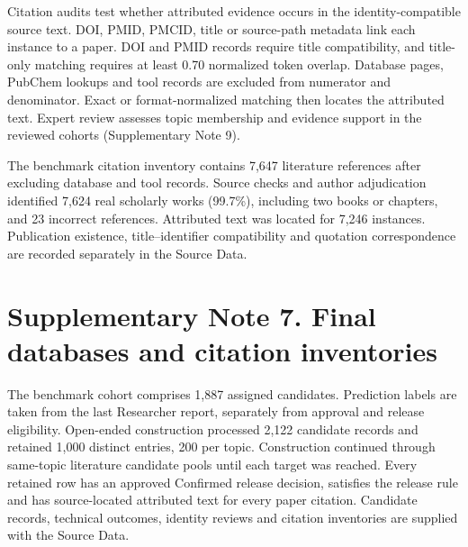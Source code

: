\documentclass[10pt]{article}
\begin{document}
Citation audits test whether attributed evidence occurs in the identity-compatible source text. DOI, PMID, PMCID, title or source-path metadata link each instance to a paper. DOI and PMID records require title compatibility, and title-only matching requires at least 0.70 normalized token overlap. Database pages, PubChem lookups and tool records are excluded from numerator and denominator. Exact or format-normalized matching then locates the attributed text. Expert review assesses topic membership and evidence support in the reviewed cohorts (Supplementary Note 9).

The benchmark citation inventory contains 7,647 literature references after excluding database and tool records. Source checks and author adjudication identified 7,624 real scholarly works (99.7\%), including two books or chapters, and 23 incorrect references. Attributed text was located for 7,246 instances. Publication existence, title--identifier compatibility and quotation correspondence are recorded separately in the Source Data.

\section*{Supplementary Note 7. Final databases and citation inventories}

The benchmark cohort comprises 1,887 assigned candidates. Prediction labels are taken from the last Researcher report, separately from approval and release eligibility. Open-ended construction processed 2,122 candidate records and retained 1,000 distinct entries, 200 per topic. Construction continued through same-topic literature candidate pools until each target was reached. Every retained row has an approved Confirmed release decision, satisfies the release rule and has source-located attributed text for every paper citation. Candidate records, technical outcomes, identity reviews and citation inventories are supplied with the Source Data.
\end{document}

